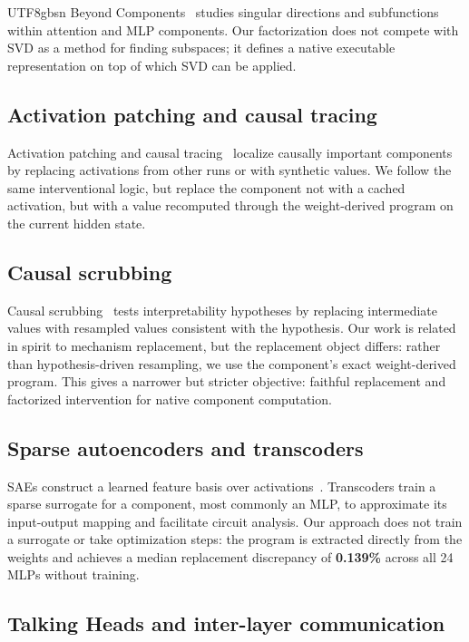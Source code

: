 \documentclass[11pt]{article}
\begin{document}
\begin{CJK*}{UTF8}{gbsn}
Beyond Components~\citep{ahmad2025beyond} studies singular directions and subfunctions within
attention and MLP components. Our factorization does not compete with
SVD as a method for finding subspaces; it defines a native executable
representation on top of which SVD can be applied.

\subsection{Activation patching and causal
tracing}

Activation patching and causal tracing~\citep{zhang2023patching,heimersheim2024patching} localize causally important
components by replacing activations from other runs or with synthetic
values. We follow the same interventional logic, but replace the
component not with a cached activation, but with a value recomputed
through the weight-derived program on the current hidden state.

\subsection{Causal scrubbing}

Causal scrubbing~\citep{chan2022causal,geiger2023causal} tests interpretability hypotheses by replacing
intermediate values with resampled values consistent with the
hypothesis. Our work is related in spirit to mechanism replacement, but
the replacement object differs: rather than hypothesis-driven
resampling, we use the component's exact weight-derived program. This
gives a narrower but stricter objective: faithful replacement and
factorized intervention for native component computation.

\subsection{Sparse autoencoders and
transcoders}

SAEs construct a learned feature basis over activations~\citep{bricken2023monosemanticity}. Transcoders
train a sparse surrogate for a component, most commonly an MLP, to
approximate its input-output mapping and facilitate circuit analysis.
Our approach does not train a surrogate or take optimization steps: the
program is extracted directly from the weights and achieves a median
replacement discrepancy of \textbf{0.139\%} across all 24 MLPs without
training.

\subsection{Talking Heads and inter-layer
communication}


\end{CJK*}
\end{document}
